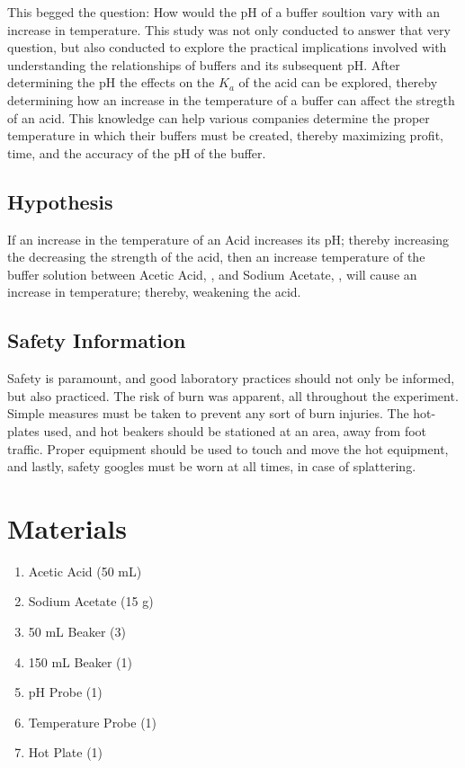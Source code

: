\documentclass{article}
\begin{document}
\noindent
This begged the question: How would the pH of a buffer soultion vary with an increase in temperature. This study was not only conducted to answer that very question, but also conducted to explore the practical implications involved with understanding the relationships of buffers and its subsequent pH. After determining the pH the effects on the $K_a$ of the acid can be explored, thereby determining how an increase in the temperature of a buffer can affect the stregth of an acid. This knowledge can help various companies determine the proper temperature in which their buffers must be created, thereby maximizing profit, time, and the accuracy of the pH of the buffer.  
\subsection*{Hypothesis}%
If an increase in the temperature of an Acid increases its pH; thereby increasing the decreasing the strength of the acid, then an increase temperature of the buffer solution between Acetic Acid, , and Sodium Acetate, , will cause an increase in temperature; thereby, weakening the acid. 
\subsection*{Safety Information}%
Safety is paramount, and good laboratory practices should not only be informed, but also practiced. The risk of burn was apparent, all throughout the experiment. Simple measures must be taken to prevent any sort of burn injuries. The hot-plates used, and hot beakers should be stationed at an area, away from foot traffic. Proper equipment should be used to touch and move the hot equipment, and lastly, safety googles must be worn at all times, in case of splattering.
\section*{Materials} %
\begin{enumerate}
\item Acetic Acid (50 mL)
\item Sodium Acetate (15 g)
\item 50 mL Beaker (3)
\item 150 mL Beaker (1)
\item pH Probe (1)
\item Temperature Probe (1)
\item Hot Plate (1)
\end{enumerate}
\end{document}
